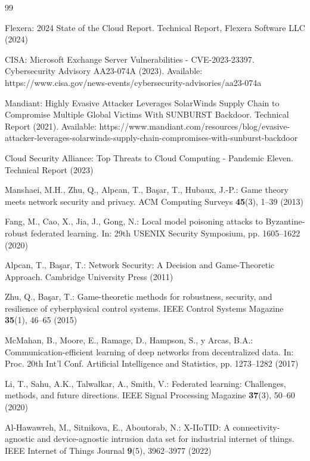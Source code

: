 \documentclass[12pt,a4paper]{article}
\theoremstyle{definition}
\begin{document}
\begin{thebibliography}{99}

Flexera: 2024 State of the Cloud Report. Technical Report, Flexera Software LLC (2024)

CISA: Microsoft Exchange Server Vulnerabilities - CVE-2023-23397. Cybersecurity Advisory AA23-074A (2023). Available: https://www.cisa.gov/news-events/cybersecurity-advisories/aa23-074a

Mandiant: Highly Evasive Attacker Leverages SolarWinds Supply Chain to Compromise Multiple Global Victims With SUNBURST Backdoor. Technical Report (2021). Available: https://www.mandiant.com/resources/blog/evasive-attacker-leverages-solarwinds-supply-chain-compromises-with-sunburst-backdoor

Cloud Security Alliance: Top Threats to Cloud Computing - Pandemic Eleven. Technical Report (2023)

Manshaei, M.H., Zhu, Q., Alpcan, T., Başar, T., Hubaux, J.-P.: Game theory meets network security and privacy. ACM Computing Surveys \textbf{45}(3), 1--39 (2013)

Fang, M., Cao, X., Jia, J., Gong, N.: Local model poisoning attacks to Byzantine-robust federated learning. In: 29th USENIX Security Symposium, pp. 1605--1622 (2020)

Alpcan, T., Başar, T.: Network Security: A Decision and Game-Theoretic Approach. Cambridge University Press (2011)

Zhu, Q., Başar, T.: Game-theoretic methods for robustness, security, and resilience of cyberphysical control systems. IEEE Control Systems Magazine \textbf{35}(1), 46--65 (2015)

McMahan, B., Moore, E., Ramage, D., Hampson, S., y Arcas, B.A.: Communication-efficient learning of deep networks from decentralized data. In: Proc. 20th Int'l Conf. Artificial Intelligence and Statistics, pp. 1273--1282 (2017)

Li, T., Sahu, A.K., Talwalkar, A., Smith, V.: Federated learning: Challenges, methods, and future directions. IEEE Signal Processing Magazine \textbf{37}(3), 50--60 (2020)

Al-Hawawreh, M., Sitnikova, E., Aboutorab, N.: X-IIoTID: A connectivity-agnostic and device-agnostic intrusion data set for industrial internet of things. IEEE Internet of Things Journal \textbf{9}(5), 3962--3977 (2022)


\end{thebibliography}
\end{document}
